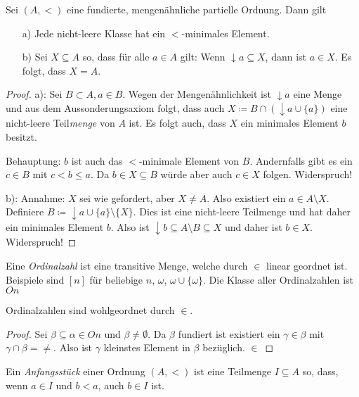 \begin{satz}[Induktionsprinzip]
	Sei $(A,<)$ eine fundierte, mengenähnliche partielle Ordnung. Dann gilt
	\begin{itemize}
		\item[a)] Jede nicht-leere Klasse hat ein $<$-minimales Element.
		\item[b)] Sei $X\subseteq A$ so, dass für alle $a\in A$ gilt: Wenn $\downarrow a \subseteq X$, dann ist $a\in X$. Es folgt, dass $X=A$.
	\end{itemize}
\end{satz}
\begin{proof}
	a): Sei $B\subset A, a\in B$. Wegen der Mengenähnlichkeit ist $\downarrow a$ eine Menge und aus dem Aussonderungsaxiom folgt, dass auch $X\coloneqq B \cap (\downarrow a \cup \{a\})$ eine nicht-leere Teil\textit{menge} von $A$ ist. Es folgt auch, dass $X$ ein minimales Element $b$ besitzt. 
	
	Behauptung: $b$ ist auch das $<$-minimale Element von $B$. Andernfalls gibt es ein $c\in B$ mit $c < b \leq a$. Da $b\in X \subseteq B$ würde aber auch $c\in X$ folgen. Widerspruch!
	
	b): Annahme: $X$ sei wie gefordert, aber $X\neq A$. Also existiert ein $a\in A\setminus X$. Definiere $B\coloneqq \downarrow a \cup \{a\} \setminus \{X\}$. Dies ist eine nicht-leere Teilmenge und hat daher ein minimales Element $b$. Also ist $\downarrow b\subseteq A\setminus B\subseteq X$ und daher ist $b\in X$. Widerspruch!
\end{proof}

\begin{definition}[Ordinalzahlen]
	Eine \textit{Ordinalzahl} ist eine transitive Menge, welche durch $\in$ linear geordnet ist. 
	Beispiele sind $[n]$ für beliebige $n$, $\omega$, $\omega \cup \{\omega\}$. Die Klasse aller Ordinalzahlen ist $On$
\end{definition}

\begin{lemma}
	Ordinalzahlen sind wohlgeordnet durch $\in$.
\end{lemma}
\begin{proof}
	Sei $\beta\subseteq \alpha\in On$ und $\beta\neq \emptyset$. Da $\beta$ fundiert ist existiert ein $\gamma\in \beta$ mit $\gamma\cap \beta =\neq$. Also ist $\gamma$ kleinstes Element in $\beta$ bezüglich. $\in$
\end{proof}

\begin{definition}[Anfangsstück]
	Ein \textit{Anfangsstück} einer Ordnung $(A,<)$ ist eine Teilmenge $I\subseteq A$ so, dass, wenn $a\in I$ und $b<a$, auch $b\in I$ ist.
\end{definition}


